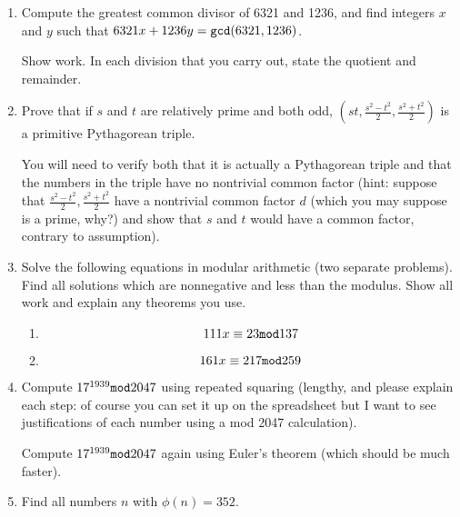 \documentclass[12pt]{article}
\begin{document}
\begin{enumerate}

\item  Compute the greatest common divisor of 6321 and 1236, and find integers $x$ and $y$ such that
$6321x + 1236y = {\tt gcd}(6321,1236)$.

Show work.  In each division that you carry out, state the quotient and remainder.

\newpage

\item  Prove that if $s$ and $t$ are relatively prime and both odd, $(st,\frac{s^2-t^2}2,\frac{s^2+t^2}2)$ is a primitive Pythagorean triple.

You will need to verify both that it is actually a Pythagorean triple and that the numbers in the triple have no nontrivial common factor (hint:  suppose that $\frac{s^2-t^2}2,\frac{s^2+t^2}2$
have a nontrivial common factor $d$ (which you may suppose is a prime, why?) and show that $s$ and $t$ would have a common factor, contrary to assumption).

\newpage

\item  Solve the following equations in modular arithmetic (two separate problems).  Find all solutions which are nonnegative and less than the modulus.  Show all work and explain any theorems you use.

\begin{enumerate}


\item $$111x \equiv 23 {\tt mod} 137$$

\item  $$161x \equiv 217 {\tt mod} 259$$

\end{enumerate}

\newpage

\item  Compute $17^{1939} {\tt mod} 2047$ using repeated squaring (lengthy, and please explain each step:  of course you can set it up on the spreadsheet
but I want to see justifications of each number using a mod 2047 calculation).

Compute $17^{1939} {\tt mod} 2047$ again using Euler's theorem (which should be much faster).

\newpage

\item  Find all numbers $n$ with $\phi(n)=352$.

\newpage


\end{enumerate}
\end{document}
